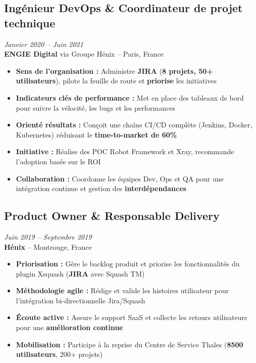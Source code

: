 \documentclass[11pt,a4paper]{article}
\newcommand{\highlight}[1]{\textcolor{primaryblue}{\textbf{#1}}}
\newcommand{\keypoint}[1]{\textbf{#1}}
\begin{document}
\subsection*{Ingénieur DevOps \& Coordinateur de projet technique} \hfill \textit{\color{mediumgray}Janvier 2020 -- Juin 2021}\\
\textcolor{primaryblue}{\textbf{ENGIE Digital}} via Groupe Hénix -- Paris, France
\begin{itemize}[leftmargin=22pt]
    \item \highlight{Sens de l'organisation :} Administre \highlight{JIRA} (\keypoint{8 projets, 50+ utilisateurs}), pilote la feuille de route et \highlight{priorise} les initiatives
    \item \highlight{Indicateurs clés de performance :} Met en place des tableaux de bord pour suivre la vélocité, les bugs et les performances
    \item \highlight{Orienté résultats :} Conçoit une chaîne CI/CD complète (Jenkins, Docker, Kubernetes) réduisant le \keypoint{time-to-market de 60\%}
    \item \highlight{Initiative :} Réalise des POC Robot Framework et Xray, recommande l'adoption basée sur le ROI
    \item \highlight{Collaboration :} Coordonne les équipes Dev, Ops et QA pour une intégration continue et gestion des \highlight{interdépendances}
\end{itemize}

\subsection*{Product Owner \& Responsable Delivery} \hfill \textit{\color{mediumgray}Juin 2019 -- Septembre 2019}\\
\textcolor{primaryblue}{\textbf{Hénix}} -- Montrouge, France
\begin{itemize}[leftmargin=22pt]
    \item \highlight{Priorisation :} Gère le backlog produit et priorise les fonctionnalités du plugin Xsquash (\highlight{JIRA} avec Squash TM)
    \item \highlight{Méthodologie agile :} Rédige et valide les histoires utilisateur pour l'intégration bi-directionnelle Jira/Squash
    \item \highlight{Écoute active :} Assure le support SaaS et collecte les retours utilisateurs pour une \highlight{amélioration continue}
    \item \highlight{Mobilisation :} Participe à la reprise du Centre de Service Thales (\keypoint{8500 utilisateurs}, 200+ projets)
\end{itemize}
\end{document}
